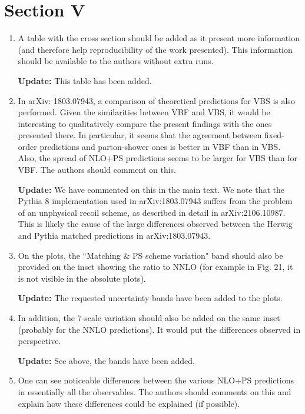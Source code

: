 \documentclass[12pt]{article}
\begin{document}
\section*{Section V}
\begin{enumerate}
\item A table with the cross section should be added as it present more information (and therefore help reproducibility of the work presented). This information should be available to the authors without extra runs.

  {\bf Update:} This table has been added.
  
\item In arXiv: 1803.07943, a comparison of theoretical predictions for VBS is also performed. Given the similarities between VBF and VBS, it would be interesting to qualitatively compare the present findings with the ones presented there. In particular, it seems that the agreement between fixed-order predictions and parton-shower ones is better in VBF than in VBS. Also, the spread of NLO+PS predictions seems to be larger for VBS than for VBF. The authors should comment on this.

  {\bf Update:} We have commented on this in the main text. We note that the Pythia 8 implementation used in arXiv:1803.07943 suffers from the problem of an unphysical recoil scheme, as described in detail in arXiv:2106.10987. This is likely the cause of the large differences observed between the Herwig and Pythia matched predictions in arXiv:1803.07943.

\item On the plots, the ``Matching \& PS scheme variation" band should also be provided on the inset showing the ratio to NNLO (for example in Fig. 21, it is not visible in the absolute plots).

  {\bf Update:} The requested uncertainty bands have been added to the plots.
  
\item In addition, the 7-scale variation should also be added on the same inset (probably for the NNLO predictions). It would put the differences observed in perspective.

  {\bf Update:} See above, the bands have been added.

\item One can see noticeable differences between the various NLO+PS predictions in essentially all the observables. The authors should comments on this and explain how these differences could be explained (if possible).


\end{enumerate}
\end{document}
